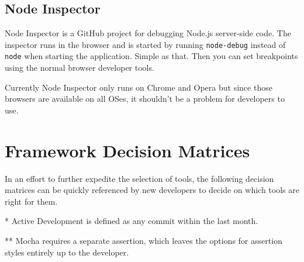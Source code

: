 \documentclass[12pt]{ucthesis}
\begin{document}
\subsection{Node Inspector}
Node Inspector \cite{NodeInspector} is a GitHub project for debugging Node.js server-side code. The inspector runs in the browser and is started by running \lstinline{node-debug} instead of \lstinline{node} when starting the application. Simple as that. Then you can set breakpoints using the normal browser developer tools.

Currently Node Inspector only runs on Chrome and Opera but since those browsers are available on all OSes, it shouldn't be a problem for developers to use.

\section{Framework Decision Matrices}
In an effort to further expedite the selection of tools, the following decision matrices can be quickly referenced by new developers to decide on which tools are right for them.

\FloatBarrier
\begin{table}[ht]
\end{table}
\FloatBarrier
\footnotesize

* Active Development is defined as any commit within the last month.

** Mocha requires a separate assertion, which leaves the options for assertion styles entirely up to the developer.
\end{document}
